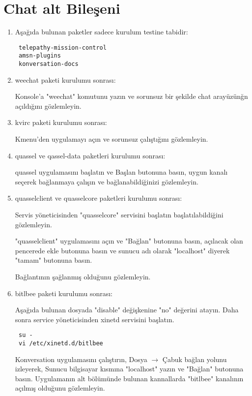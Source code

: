 \documentclass[a4paper,10pt]{article}
\begin{document}
\section{Chat alt Bileşeni}
\begin{enumerate}

\item Aşağıda bulunan paketler sadece kurulum testine tabidir:

\begin{verbatim}
 telepathy-mission-control
 amsn-plugins
 konversation-docs 
\end{verbatim}

\item weechat paketi kurulumu sonrası:

Konsole'a "weechat" komutunu yazın ve sorunsuz bir şekilde chat arayüzünğn açıldığını gözlemleyin.

\item kvirc paketi kurulumu sonrası:

Kmenu'den uygulamayı açın ve sorunsuz çalıştığını gözlemleyin.

\item quassel ve qassel-data paketleri kurulumu sonrası:

quassel uygulamasını başlatın ve Başlan butonuna basın, uygun kanalı seçerek bağlanmaya çalışın ve bağlanabildiğinizi gözlemleyin.

\item quasselclient ve quasselcore paketleri kurulumu sonrası:

Servis yöneticisinden "quasselcore" servisini başlatın başlatılabildiğini gözlemleyin.

"quasselclient" uygulamasını açın ve "Bağlan" butonuna basın, açılacak olan pencerede ekle butonuna basın ve sunucu adı olarak "localhost" diyerek "tamam" butonuna basın.

Bağlantının şağlanmış olduğunu gözlemleyin.

\item bitlbee paketi kurulumu sonrası:

Aşağıda bulunan dosyada "disable" değişkenine "no" değerini atayın. Daha sonra service yöneticisinden xinetd servisini başlatın. 
\begin{verbatim}
 su -
 vi /etc/xinetd.d/bitlbee
\end{verbatim}

Konversation uygulamasını çalıştırın, Dosya $\rightarrow$ Çabuk bağlan yolunu izleyerek, Sunucu bilgisayar kısmına "localhost" yazın ve "Bağlan" butonuna basın. Uygulamanın alt bölümünde bulunan kannallarda "bitlbee" kanalının açılmış olduğunu gözlemleyin.


\end{enumerate}
\end{document}
